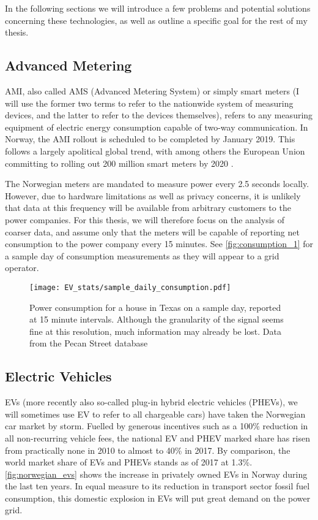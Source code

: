 \documentclass[12pt, american]{article}
\begin{document}
In the following sections we will introduce a few problems and potential solutions concerning these technologies, as well as outline a specific goal for the rest of my thesis.

\subsection{Advanced Metering}

AMI, also called AMS (Advanced Metering System) or simply smart meters (I will use the former two terms to refer to the nationwide system of measuring devices, and the latter to refer to the devices themselves), refers to any measuring equipment of electric energy consumption capable of two-way communication. In Norway, the AMI rollout is scheduled to be completed by January 2019. This follows a largely apolitical global trend, with among others the European Union committing to rolling out 200 million smart meters by 2020 \cite{EuropeanCommision2018}. 

The Norwegian meters are mandated to measure power every 2.5 seconds locally. However, due to hardware limitations as well as privacy concerns, it is unlikely that data at this frequency will be available from arbitrary customers to the power companies. For this thesis, we will therefore focus on the analysis of coarser data, and assume only that the meters will be capable of reporting net consumption to the power company every 15 minutes. See \autoref{fig:consumption_1} for a sample day of consumption measurements as they will appear to a grid operator.

\begin{figure}[h]
\centering
\def\svgwidth{\columnwidth}
\caption{Power consumption for a house in Texas on a sample day, reported at 15 minute intervals. Although the granularity of the signal seems fine at this resolution, much information may already be lost. Data from the Pecan Street database}
\texttt{[image: EV\_stats/sample\_daily\_consumption.pdf]}
\label{fig:consumption_1}
\end{figure}


\subsection{Electric Vehicles}

EVs (more recently also so-called plug-in hybrid electric vehicles (PHEVs), we will sometimes use EV to refer to all chargeable cars) have taken the Norwegian car market by storm. Fuelled by generous incentives such as a 100\% reduction in all non-recurring vehicle fees, the national EV and PHEV marked share has risen from practically none in 2010 to almost to 40\% in 2017\cite{Norskelbilforening2018}. By comparison, the world market share of EVs and PHEVs stands as of 2017 at 1.3\%\cite{EVvolu}. \autoref{fig:norwegian_evs} shows the increase in privately owned EVs in Norway during the last ten years. In equal measure to its reduction in transport sector fossil fuel consumption, this domestic explosion in EVs will put great demand on the power grid. 
\end{document}
